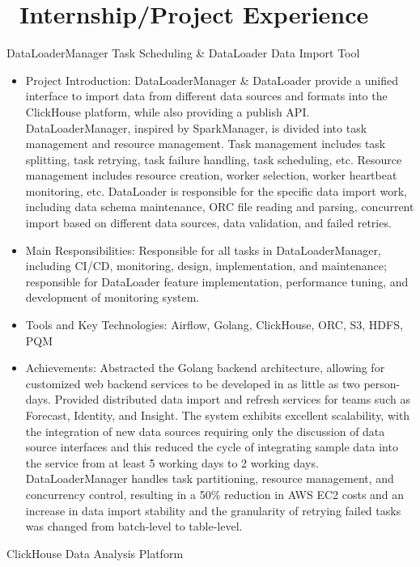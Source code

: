\documentclass{resume}
\begin{document}
\section{\faUsers\ Internship/Project Experience}
DataLoaderManager Task Scheduling \& DataLoader Data Import Tool
\begin{itemize}
\item Project Introduction: DataLoaderManager \& DataLoader provide a unified interface to import data from different data sources and formats into the ClickHouse platform, while also providing a publish API. DataLoaderManager, inspired by SparkManager, is divided into task management and resource management. Task management includes task splitting, task retrying, task failure handling, task scheduling, etc. Resource management includes resource creation, worker selection, worker heartbeat monitoring, etc. DataLoader is responsible for the specific data import work, including data schema maintenance, ORC file reading and parsing, concurrent import based on different data sources, data validation, and failed retries.
\item Main Responsibilities: Responsible for all tasks in DataLoaderManager, including CI/CD, monitoring, design, implementation, and maintenance; responsible for DataLoader feature implementation, performance tuning, and development of monitoring system.
\item Tools and Key Technologies: Airflow, Golang, ClickHouse, ORC, S3, HDFS, PQM
\item Achievements: Abstracted the Golang backend architecture, allowing for customized web backend services to be developed in as little as two person-days. Provided distributed data import and refresh services for teams such as Forecast, Identity, and Insight. The system exhibits excellent scalability, with the integration of new data sources requiring only the discussion of data source interfaces and this reduced the cycle of integrating sample data into the service from at least 5 working days to 2 working days. DataLoaderManager handles task partitioning, resource management, and concurrency control, resulting in a 50\% reduction in AWS EC2 costs and an increase in data import stability and the granularity of retrying failed tasks was changed from batch-level to table-level.
\end{itemize}
ClickHouse Data Analysis Platform
\end{document}
